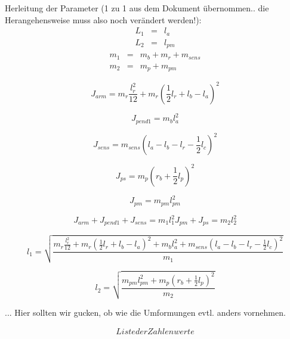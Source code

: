 Herleitung der Parameter (1 zu 1 aus dem Dokument übernommen.. die Herangehensweise muss also noch verändert werden!):
\begin{eqnarray}
L_1 &=& l_a \nonumber \\
L_2 &=& l_{pm}
\end{eqnarray}
\begin{eqnarray}
m_1 &=& m_b+m_r+m_{sens} \nonumber \\
m_2 &=& m_p+m_{pm}
\end{eqnarray}

\begin{equation}
J_{arm} = m_r \frac{l^2_r}{12}+m_r(\frac{1}{2}l_r+l_b-l_a)^2
\end{equation}

\begin{equation}
J_{pend1}=m_bl^2_a
\end{equation}

\begin{equation}
J_{sens}=m_{sens}(l_a-l_b-l_r-\frac{1}{2}l_c)^2
\end{equation}

\begin{equation}
J_{ps}=m_p(r_b+\frac{1}{2}l_p)^2
\end{equation}

\begin{equation}
J_{pm}=m_{pm}l^2_{pm}
\end{equation}

\begin{equation}
J_{arm}+J_{pend1}+J_{sens}=m_1l^2_1J_{pm}+J_{ps}=m_2l^2_2
\end{equation}

\begin{equation}
l_1=\sqrt{\frac{m_r \frac{l^2_r}{12}+m_r(\frac{1}{2}l_r+l_b-l_a)^2+m_bl^2_a+m_{sens}(l_a-l_b-l_r-\frac{1}{2}l_c)^2}{m_1}}
\end{equation}

\begin{equation}
l_2=\sqrt{\frac{m_{pm}l^2_{pm}+m_p(r_b+\frac{1}{2}l_p)^2}{m_2}}
\end{equation}

... Hier sollten wir gucken, ob wie die Umformungen evtl. anders vornehmen.

\begin{eqnarray}
Liste der Zahlenwerte
\end{eqnarray}

